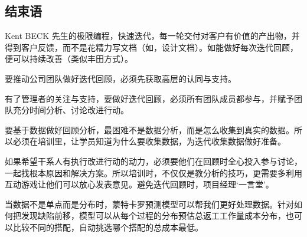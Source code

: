 \hypertarget{ux7ed3ux675fux8bed}{%
\subsection{结束语}\label{ux7ed3ux675fux8bed}}

Kent BECK
先生的极限编程，快速迭代，每一轮交付对客户有价值的产出物，并得到客户反馈，而不是花精力写文档（如，设计文档）。如能做好每次迭代回顾，便可以持续改善（类似丰田方式）。

要推动公司团队做好迭代回顾，必须先获取高层的认同与支持。




有了管理者的关注与支持，要做好迭代回顾，必须所有团队成员都参与，并赋予团队充分时间分析、讨论改进行动。

要基于数据做好回顾分析，最困难不是数据分析，而是怎么收集到真实的数据。所以必须在培训里，让学员知道为什么要收集数据，为迭代收集数据做好准备。

如果希望干系人有执行改进行动的动力，必须要他们在回顾时全心投入参与讨论，一起找根本原因和解决方案。所以培训时，不仅仅是教分析的技巧，更需要多利用互动游戏让他们可以放心发表意见。避免迭代回顾时，项目经理`一言堂'。

当数据不是单点而是分布时，蒙特卡罗预测模型可以帮我们更好处理数据。针对如何把发现缺陷前移，模型可以从每个过程的分布预估总返工工作量成本分布，也可以比较不同的搭配，自动挑选哪个搭配的总成本最低。

